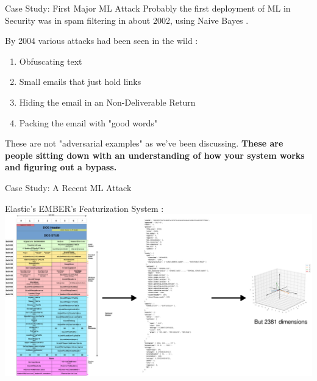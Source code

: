 \documentclass{beamer}
\begin{document}
\begin{frame}{Case Study: First Major ML Attack}
    Probably the first deployment of ML in Security was in spam filtering in about 2002, using Naive Bayes \cite{spam_bayes}.
    \vspace{10pt} \pause

    By 2004 various attacks had been seen in the wild \cite{how_to_beat_spam}:
    \begin{enumerate}
        \item Obfuscating text 
        \item Small emails that just hold links
        \item Hiding the email in an Non-Deliverable Return
        \item Packing the email with "good words"
    \end{enumerate}
    \vspace{10pt} \pause

    These are not "adversarial examples" as we've been discussing. \textbf{These are people sitting down with an understanding of how your system works and figuring out a bypass.}
\end{frame}

\begin{frame}{Case Study: A Recent ML Attack}
    \begin{center}
        Elastic's EMBER's Featurization System \cite{anderson2018ember}:
        \includegraphics[scale=0.18]{ember_diagram.png}
    \end{center}
\end{frame}
\end{document}
